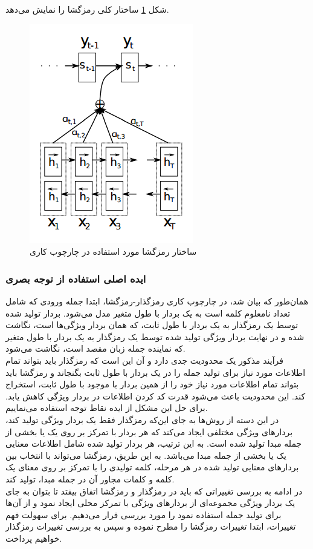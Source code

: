 شکل \ref{fig:decoder} ساختار کلی رمزگشا را نمایش می‌دهد.

\begin{figure}[h]
	\centering
	\includegraphics[scale=0.7]{Imgs/5-decoder.png}
	\caption{ساختار رمزگشا مورد استفاده در چارچوب کاری \cite{bahdanau2014neural}}
	\label{fig:decoder}
\end{figure}

\subsubsection{ایده اصلی استفاده از توجه بصری}

همان‌طور که بیان شد، در چارچوب کاری رمزگذار-رمزگشا، ابتدا جمله ورودی که شامل تعداد نامعلوم کلمه است به یک بردار با طول متغیر مدل می‌شود. بردار تولید شده توسط یک رمزگذار به یک بردار با طول ثابت، که همان بردار ویژگی‌ها است، نگاشت شده و در نهایت بردار ویژگی تولید شده توسط یک رمزگذار به یک بردار با طول متغیر که نماینده جمله زبان مقصد است، نگاشت می‌شود.
\\
فرآیند مذکور یک محدودیت جدی دارد و آن این است که رمزگذار باید بتواند تمام اطلاعات مورد نیاز برای تولید جمله را در یک بردار با طول ثابت بگنجاند و رمزگشا باید بتواند تمام اطلاعات مورد نیاز خود را از همین بردار با موجود با طول ثابت، استخراج کند. این محدودیت باعث می‌شود قدرت کد کردن اطلاعات در بردار ویژگی کاهش یابد. برای حل این مشکل از ایده نقاط توجه استفاده می‌نماییم.
\\
در این دسته از روش‌ها به جای این‌که رمزگذار فقط یک بردار ویژگی تولید کند، بردارهای ویژگی مختلفی ایجاد می‌کند که هر بردار با تمرکز بر روی یک یا بخشی از جمله مبدا تولید شده است. به این ترتیب، هر بردار تولید شده شامل اطلاعات معنایی یک یا بخشی از جمله مبدا می‌باشد. به این طریق، رمزگشا می‌تواند با انتخاب بین بردارهای معنایی تولید شده در هر مرحله، کلمه تولیدی را با تمرکز بر روی معنای یک کلمه و کلمات مجاور آن در جمله مبدا، تولید کند.
\\
در ادامه به بررسی تغییراتی که باید در رمزگذار و رمزگشا اتفاق بیفتد تا بتوان به جای یک بردار ویژگی مجموعه‌ای از بردارهای ویژگی با تمرکز محلی ایجاد نمود و از آن‌ها برای تولید جمله استفاده نمود را مورد بررسی قرار می‌دهیم. برای سهولت فهم تغییرات، ابتدا تغییرات رمزگشا را مطرح نموده و سپس به بررسی تغییرات رمزگذار خواهیم پرداخت.
